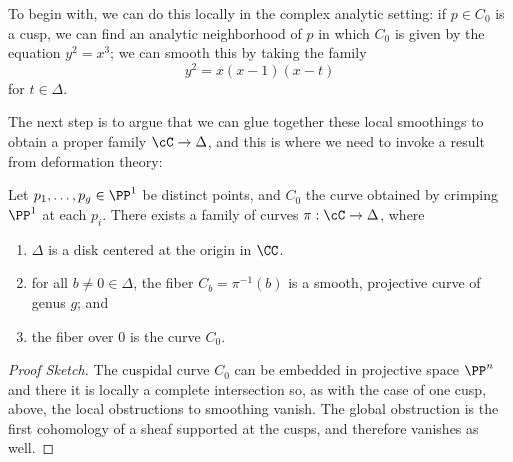To begin with, we can do this locally in the complex analytic setting: if $p \in C_0$ is a cusp, we can find an analytic neighborhood of $p$ in which $C_0$ is given by the equation $y^2 = x^3$; we can smooth this by taking the family
$$
y^2 = x(x-1)(x-t)
$$
for $t\in \Delta$.

The next step is to argue that we can glue together these local smoothings to obtain a proper family $\cC \to \Delta$, and this is where we need to invoke a result from deformation theory:

\begin{lemma}\label{specialization to cuspidal curve}
Let $p_1,\dots,p_g \in \PP^1$ be distinct points, and $C_0$ the curve obtained by 
crimping $\PP^1$ at each $p_i$. There exists a family of curves $\pi : \cC \to \Delta$, where
\begin{enumerate}
\item $\Delta$ is a disk centered at the origin in $\CC$.
\item for all $b \neq 0 \in \Delta$, the fiber $C_b = \pi^{-1}(b)$ is a smooth, projective curve of genus $g$;  and
\item the fiber over $0$ is the curve $C_0$.
\end{enumerate}
\end{lemma}

\begin{proof}[Proof Sketch]
The cuspidal curve $C_{0}$ can be embedded in projective space $\PP^{n}$ and there
it is locally a complete intersection so, as with the case of one cusp, above, the local obstructions
to smoothing vanish. The global obstruction is the first cohomology of a sheaf supported at the cusps,
and therefore vanishes as well.
\end{proof}


